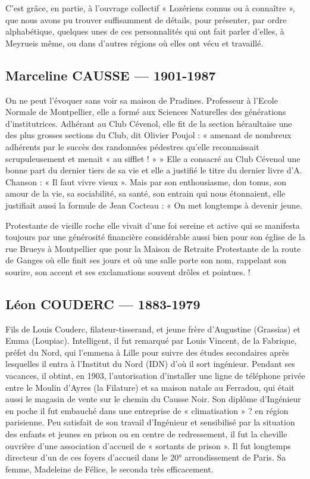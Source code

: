 
C’est grâce, en partie, à l’ouvrage collectif « Lozériens connus ou à connaître », que
nous avons pu trouver suffisamment de détails, pour présenter, par ordre alphabétique,
quelques unes de ces personnalités qui ont fait parler d’elles, à Meyrueis même, ou
dans d’autres régions où elles ont vécu et travaillé.

\subsection{Marceline CAUSSE --- 1901-1987}

On ne peut l’évoquer sans voir sa maison de Pradines. Professeur à l’Ecole Normale
de Montpellier, elle a formé aux Sciences Naturelles des générations d’institutrices.
Adhérant au Club Cévenol, elle fit de la section héraultaise une des plus grosses
sections du Club, dit Olivier Poujol : « amenant de nombreux adhérents par le succès des
randonnées pédestres qu’elle reconnaissait scrupuleusement et menait « au sifflet ! » »
Elle a consacré au Club Cévenol une bonne part du dernier tiers de sa vie et elle a justifié le titre du
dernier livre d’A. Chanson : « Il faut vivre vieux ». Mais par son enthousiasme, don tonus, son
amour de la vie, sa sociabilité, sa santé, son entrain qui nous étonnaient, elle justifiait aussi la formule
de Jean Cocteau : « On met longtemps à devenir jeune.

Protestante de vieille roche elle vivait d’une foi sereine et active qui se manifesta
toujours par une générosité financière considérable aussi bien pour son église de la
rue Brueys à Montpellier que pour la Maison de Retraite Protestante de la route de
Ganges où elle finit ses jours et où une salle porte son nom, rappelant son sourire,
son accent et ses exclamations souvent drôles et pointues. !

\subsection{Léon COUDERC --- 1883-1979}

Fils de Louis Couderc, filateur-tisserand, et jeune frère d’Augustine (Grassias) et Emma
(Loupiac). Intelligent, il fut remarqué par Louis Vincent, de la Fabrique, préfet du Nord, qui
l’emmena à Lille pour suivre des études secondaires après lesquelles il entra à l’Institut du
Nord (IDN) d’où il sort ingénieur.
Pendant ses vacances, il obtint, en 1903, l’autorisation d’installer une ligne de téléphone
privée entre le Moulin d’Ayres (la Filature) et sa maison natale au Ferradou, qui était aussi le
magasin de vente sur le chemin du Causse Noir.
Son diplôme d’Ingénieur en poche il fut embauché dans une entreprise de « climatisation » ?
en région parisienne.
Peu satisfait de son travail d’Ingénieur et sensibilisé par la situation des enfants et jeunes en
prison ou en centre de redressement, il fut la cheville ouvrière d’une association d’accueil de
« sortants de prison ». Il fut longtemps directeur d’un de ces foyers d’accueil dans le 20°
arrondissement de Paris. Sa femme, Madeleine de Félice, le seconda très efficacement.

